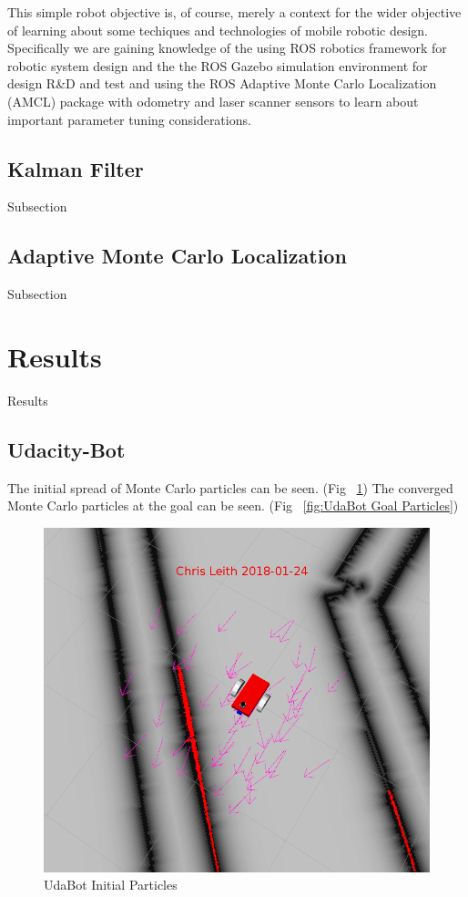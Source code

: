 \documentclass[10pt,journal,compsoc]{IEEEtran}
\begin{document}
This simple robot objective is, of course, merely a context for the wider objective of learning about some techiques and technologies of mobile robotic design. Specifically we are gaining knowledge of the using ROS robotics framework for robotic system design and the the ROS Gazebo simulation environment for design R\&D and test and using the ROS Adaptive Monte Carlo Localization (AMCL) package with odometry and laser scanner sensors to learn about important parameter tuning considerations. 

\subsection{Kalman Filter}
Subsection

\subsection{Adaptive Monte Carlo Localization}
Subsection

\section{Results}
Results

\subsection{Udacity-Bot}
The initial spread of Monte Carlo particles can be seen. (Fig ~\ref{fig:UdaBot Initial Particles})
The converged Monte Carlo particles at the goal can be seen. (Fig ~\ref{fig:UdaBot Goal Particles})

\begin{figure}[h]
      \centering
      \includegraphics[width=\linewidth]{../Assets/writeupImages/udaBot_rvizInit.png}
      \caption{UdaBot Initial Particles }
      \label{fig:UdaBot Initial Particles}
\end{figure}
\end{document}
